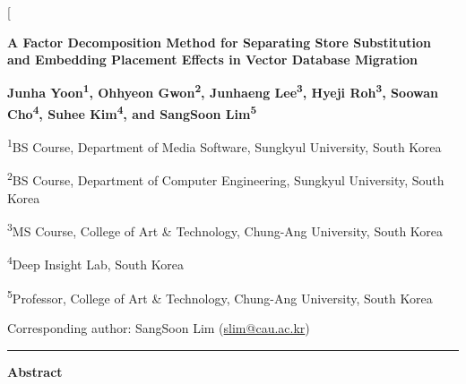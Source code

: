 \documentclass[10pt,a4paper,twocolumn]{article}
\begin{document}
\thispagestyle{firstpage}

\twocolumn[
  \begin{center}
        {\fontsize{16}{20}\selectfont\bfseries A Factor Decomposition Method for Separating Store Substitution and Embedding Placement Effects in Vector Database Migration}\par
  \end{center}
  \vspace{9pt}
  \begin{center}
    {\bfseries\fontsize{8}{9.6}\selectfont Junha Yoon\textsuperscript{1}, Ohhyeon Gwon\textsuperscript{2}, Junhaeng Lee\textsuperscript{3}, Hyeji Roh\textsuperscript{3}, Soowan Cho\textsuperscript{4}, Suhee Kim\textsuperscript{4}, and SangSoon Lim\textsuperscript{5}}\par
  \end{center}
  \vspace{6pt}
  {\fontsize{10}{12}\selectfont \textsuperscript{1}BS Course, Department of Media Software, Sungkyul University, South Korea}\par
  \vspace{2pt}
  {\fontsize{10}{12}\selectfont \textsuperscript{2}BS Course, Department of Computer Engineering, Sungkyul University, South Korea}\par
  \vspace{2pt}
  {\fontsize{10}{12}\selectfont \textsuperscript{3}MS Course, College of Art \& Technology, Chung-Ang University, South Korea}\par
  \vspace{2pt}
  {\fontsize{10}{12}\selectfont \textsuperscript{4}Deep Insight Lab, South Korea}\par
  \vspace{2pt}
  {\fontsize{10}{12}\selectfont \textsuperscript{5}Professor, College of Art \& Technology, Chung-Ang University, South Korea}\par
  \vspace{4pt}
  {\fontsize{10}{12}\selectfont Corresponding author: SangSoon Lim (\url{slim@cau.ac.kr})}\par
  \vspace{7pt}
  \noindent\rule{\linewidth}{0.6pt}\par
  \vspace{3pt}
  {\bfseries\fontsize{12}{14}\selectfont Abstract}\par
\end{document}
